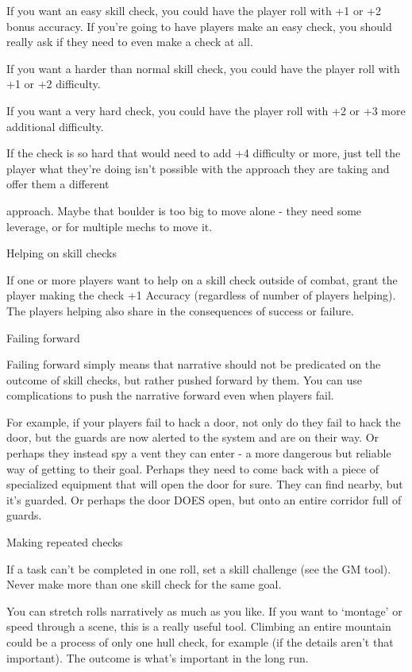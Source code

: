 If you want an easy skill check, you could have the player roll with +1 or +2 bonus accuracy. If
you’re going to have players make an easy check, you should really ask if they need to even
make a check at all.

If you want a harder than normal skill check, you could have the player roll with +1 or +2
difficulty.

If you want a very hard check, you could have the player roll with +2 or +3 more additional
difficulty.


If the check is so hard that would need to add +4 difficulty or more, just tell the player what
they’re doing isn’t possible with the approach they are taking and offer them a different




approach. Maybe that boulder is too big to move alone - they need some leverage, or for
multiple mechs to move it.


                                          Helping on skill checks


If one or more players want to help on a skill check outside of combat, grant the player making
the check +1 Accuracy (regardless of number of players helping). The players helping also share
in the consequences of success or failure.


                                              Failing forward


Failing forward simply means that narrative should not be predicated on the outcome of skill
checks, but rather pushed forward by them. You can use complications to push the narrative
forward even when players fail.

For example, if your players fail to hack a door, not only do they fail to hack the door, but the
guards are now alerted to the system and are on their way. Or perhaps they instead spy a vent
they can enter - a more dangerous but reliable way of getting to their goal. Perhaps they need to
come back with a piece of specialized equipment that will open the door for sure. They can find
nearby, but it’s guarded. Or perhaps the door DOES open, but onto an entire corridor full of
guards.


                                         Making repeated checks

If a task can’t be completed in one roll, set a skill challenge (see the GM tool). Never make more
than one skill check for the same goal.


You can stretch rolls narratively as much as you like. If you want to `montage' or speed through a
scene, this is a really useful tool. Climbing an entire mountain could be a process of only one hull
check, for example (if the details aren’t that important). The outcome is what’s important in the
long run.


